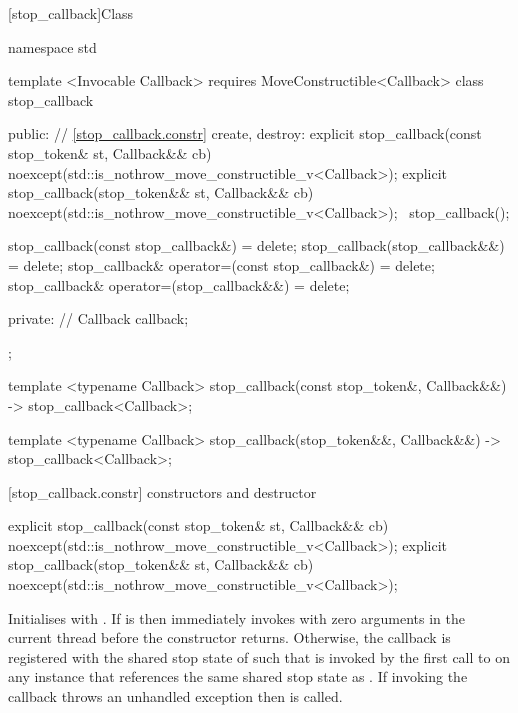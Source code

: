 {%
%
[stop_callback]{Class }

\pnum
{}%

\begin{codeblock}
namespace std {
  template <Invocable Callback>
    requires MoveConstructible<Callback>
  class stop_callback {
  public:
    // \ref{stop_callback.constr} create, destroy:
    explicit stop_callback(const stop_token& st, Callback&& cb)
        noexcept(std::is_nothrow_move_constructible_v<Callback>);
    explicit stop_callback(stop_token&& st, Callback&& cb)
        noexcept(std::is_nothrow_move_constructible_v<Callback>);
    ~stop_callback();

    stop_callback(const stop_callback&) = delete;
    stop_callback(stop_callback&&) = delete;
    stop_callback& operator=(const stop_callback&) = delete;
    stop_callback& operator=(stop_callback&&) = delete;

  private:
    // \expos
    Callback callback; 
  };

  template <typename Callback>
  stop_callback(const stop_token&, Callback&&) -> stop_callback<Callback>;

  template <typename Callback>
  stop_callback(stop_token&&, Callback&&) -> stop_callback<Callback>;
}
\end{codeblock}

[stop_callback.constr]{ constructors and destructor}

%
\begin{itemdecl}
explicit stop_callback(const stop_token& st, Callback&& cb)
  noexcept(std::is_nothrow_move_constructible_v<Callback>);
explicit stop_callback(stop_token&& st, Callback&& cb)
  noexcept(std::is_nothrow_move_constructible_v<Callback>);
\end{itemdecl}
\begin{itemdescr}
  \pnum\effects Initialises  with .
                If  is  then immediately invokes
                with zero arguments in the current thread before the constructor returns.
                Otherwise, the callback is registered with the shared stop state of 
                such that  is invoked by the first call to 
                on any  instance  that references the same shared stop
                state as .
                If invoking the callback throws an unhandled exception then  is called.


\end{itemdescr}}
